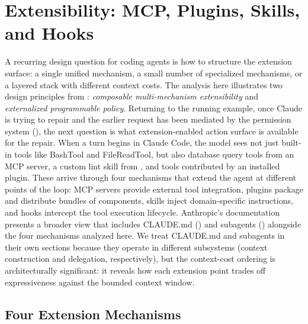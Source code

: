 \section{Extensibility: MCP, Plugins, Skills, and Hooks}
\label{sec:ext}

A recurring design question for coding agents is how to structure the extension surface: a single unified mechanism, a small number of specialized mechanisms, or a layered stack with different context costs. The analysis here illustrates two design principles from : \emph{composable multi-mechanism extensibility} and \emph{externalized programmable policy}. Returning to the running example, once Claude is trying to repair  and the earlier  request has been mediated by the permission system (), the next question is what extension-enabled action surface is available for the repair. When a turn begins in Claude Code, the model sees not just built-in tools like BashTool and FileReadTool, but also database query tools from an MCP server, a custom lint skill from , and tools contributed by an installed plugin. These arrive through four mechanisms that extend the agent at different points of the loop: MCP servers provide external tool integration, plugins package and distribute bundles of components, skills inject domain-specific instructions, and hooks intercept the tool execution lifecycle. Anthropic's documentation~\citep{anthropic2026howworks} presents a broader view that includes CLAUDE.md () and subagents () alongside the four mechanisms analyzed here. We treat CLAUDE.md and subagents in their own sections because they operate in different subsystems (context construction and delegation, respectively), but the context-cost ordering is architecturally significant: it reveals how each extension point trades off expressiveness against the bounded context window.

\subsection{Four Extension Mechanisms}
\label{sec:ext:mechanisms}

